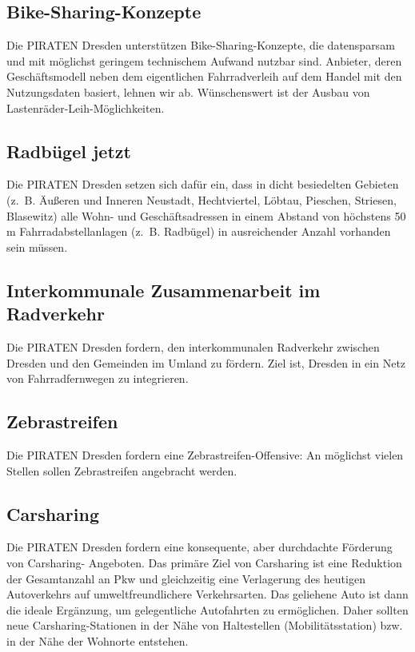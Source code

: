 \documentclass[a4paper, 11pt]{article}
\begin{document}
\subsection{Bike-Sharing-Konzepte}
Die PIRATEN Dresden unterstützen Bike-Sharing-Konzepte, die datensparsam und mit möglichst geringem technischem Aufwand nutzbar sind. Anbieter, deren Geschäftsmodell neben dem eigentlichen Fahrradverleih auf dem Handel mit den Nutzungsdaten basiert, lehnen wir ab. Wünschenswert ist der Ausbau von Lastenräder-Leih-Möglichkeiten.


\subsection{Radbügel jetzt}
Die PIRATEN Dresden setzen sich dafür ein, dass in dicht besiedelten Gebieten (z. B. Äußeren und Inneren Neustadt, Hechtviertel, Löbtau, Pieschen, Striesen, Blasewitz) alle Wohn- und Geschäftsadressen in einem Abstand von höchstens 50 m Fahrradabstellanlagen (z. B. Radbügel) in ausreichender Anzahl vorhanden sein müssen.


\subsection{Interkommunale Zusammenarbeit im Radverkehr}
Die PIRATEN Dresden fordern, den interkommunalen Radverkehr zwischen Dresden und den Gemeinden im Umland zu fördern. Ziel ist, Dresden in ein Netz von Fahrradfernwegen zu integrieren.


\subsection{Zebrastreifen}
Die PIRATEN Dresden fordern eine Zebrastreifen-Offensive: An möglichst vielen Stellen sollen Zebrastreifen angebracht werden.


\subsection{Carsharing}
Die PIRATEN Dresden fordern eine konsequente, aber durchdachte Förderung von Carsharing- Angeboten. Das primäre Ziel von Carsharing ist eine Reduktion der Gesamtanzahl an Pkw und gleichzeitig eine Verlagerung des heutigen Autoverkehrs auf umweltfreundlichere Verkehrsarten. Das geliehene Auto ist dann die ideale Ergänzung, um gelegentliche Autofahrten zu ermöglichen. Daher sollten neue Carsharing-Stationen in der Nähe von Haltestellen (Mobilitätsstation) bzw. in der Nähe der Wohnorte entstehen.\newline
\end{document}
